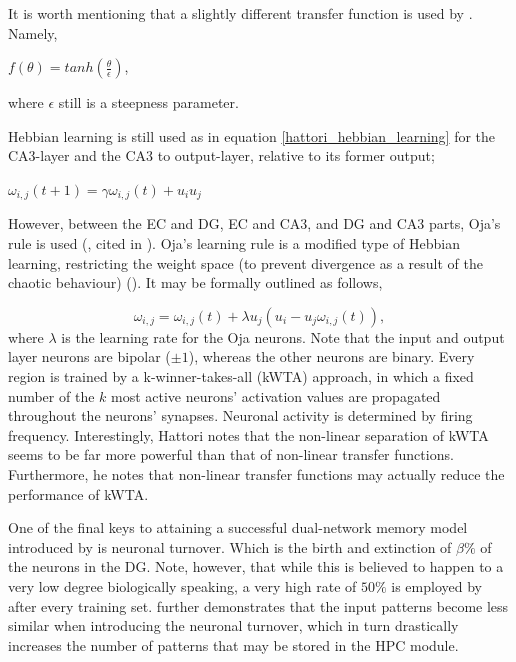 It is worth mentioning that a slightly different transfer function is used by \cite{Hattori2014}. Namely,

\begin{center}
    $f(\theta) = tanh(\frac{\theta}{\epsilon})$,
\end{center}
where $\epsilon$ still is a steepness parameter.

Hebbian learning is still used as in equation \ref{hattori_hebbian_learning} for the CA3-layer and the CA3 to output-layer, relative to its former output;

\begin{center}
\begin{math}
    \omega_{i,j}(t+1) = \gamma \omega_{i,j}(t) + u_i u_j
\end{math}
\end{center}

However, between the EC and DG, EC and CA3, and DG and CA3 parts, Oja's rule is used (\cite{Hertz1991}, cited in \cite{Hattori2014}). Oja's learning rule is a modified type of Hebbian learning, restricting the weight space (to prevent divergence as a result of the chaotic behaviour) (\cite{}). It may be formally outlined as follows,

\begin{equation}\label{ojas_rule}
    \omega_{i,j} = \omega_{i,j}(t) + \lambda u_j (u_i - u_j \omega_{i,j}(t)),
\end{equation}
where $\lambda$ is the learning rate for the Oja neurons. Note that the input and output layer neurons are bipolar ($\pm 1$), whereas the other neurons are binary. Every region is trained by a k-winner-takes-all (kWTA) approach, in which a fixed number of the $k$ most active neurons' activation values are propagated throughout the neurons' synapses. Neuronal activity is determined by firing frequency. Interestingly, Hattori notes that the non-linear separation of kWTA seems to be far more powerful than that of non-linear transfer functions. Furthermore, he notes that non-linear transfer functions may actually reduce the performance of kWTA.

One of the final keys to attaining a successful dual-network memory model introduced by \cite{Hattori2014} is neuronal turnover. Which is the birth and extinction of $\beta \%$ of the neurons in the DG. Note, however, that while this is believed to happen to a very low degree biologically speaking, a very high rate of $50 \%$ is employed by \cite{Hattori2014}after every training set. \cite{Hattori2014} further demonstrates that the input patterns become less similar when introducing the neuronal turnover, which in turn drastically increases the number of patterns that may be stored in the HPC module.

